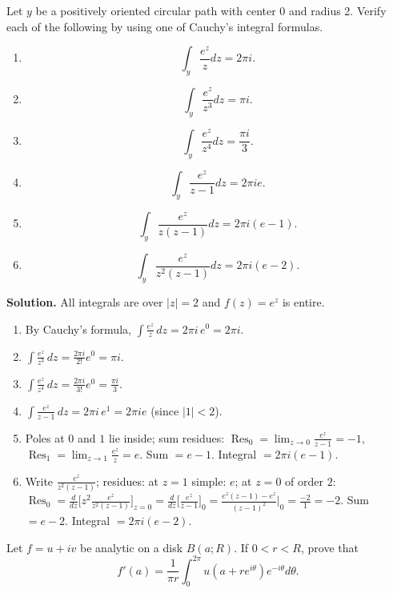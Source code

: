 \begin{problembox}
Let \( y \) be a positively oriented circular path with center 0 and radius 2. Verify each of the following by using one of Cauchy's integral formulas.
\begin{enumerate}[label=(\alph*)]
\item \[ \int_y \frac{e^z}{z} dz = 2\pi i. \]
\item \[ \int_y \frac{e^z}{z^3} dz = \pi i. \]
\item \[ \int_y \frac{e^z}{z^4} dz = \frac{\pi i}{3}. \]
\item \[ \int_y \frac{e^z}{z - 1} dz = 2\pi ie. \]
\item \[ \int_y \frac{e^z}{z(z - 1)} dz = 2\pi i(e - 1). \]
\item \[ \int_y \frac{e^z}{z^2(z - 1)} dz = 2\pi i(e - 2). \]
\end{enumerate}
\end{problembox}

\noindent\textbf{Solution.}
All integrals are over $|z|=2$ and $f(z)=e^z$ is entire.
\begin{enumerate}[label=(\alph*)]
\item By Cauchy's formula, $\int\frac{e^z}{z}\,dz=2\pi i\,e^0=2\pi i$.
\item $\int\frac{e^z}{z^3}\,dz=\frac{2\pi i}{2!}e^0=\pi i$.
\item $\int\frac{e^z}{z^4}\,dz=\frac{2\pi i}{3!}e^0=\frac{\pi i}{3}$.
\item $\int\frac{e^z}{z-1}\,dz=2\pi i\,e^1=2\pi i e$ (since $|1|<2$).
\item Poles at $0$ and $1$ lie inside; sum residues: $\operatorname{Res}_{0}=\lim_{z\to0}\frac{e^z}{z-1}=-1$, $\operatorname{Res}_{1}=\lim_{z\to1}\frac{e^z}{z}=e$. Sum $=e-1$. Integral $=2\pi i(e-1)$.
\item Write $\frac{e^z}{z^2(z-1)}$; residues: at $z=1$ simple: $e$; at $z=0$ of order $2$: $\operatorname{Res}_{0}=\frac{d}{dz}\big[z^2\frac{e^z}{z^2(z-1)}\big]_{z=0}=\frac{d}{dz}\big[\frac{e^z}{z-1}\big]_{0}=\frac{e^z(z-1)-e^z}{(z-1)^2}\Big|_{0}=\frac{-2}{1}= -2$. Sum $=e-2$. Integral $=2\pi i(e-2)$.
\end{enumerate}

\begin{problembox}
Let \( f = u + iv \) be analytic on a disk \( B(a; R) \). If \( 0 < r < R \), prove that
\[f'(a) = \frac{1}{\pi r} \int_0^{2\pi} u(a + re^{i\theta}) e^{-i\theta} d\theta.\]
\end{problembox}

